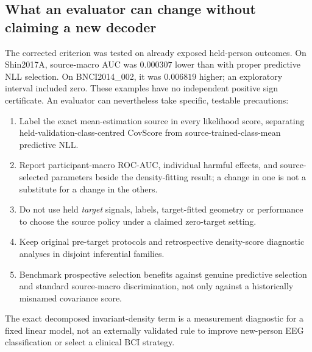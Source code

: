 \subsection{What an evaluator can change without claiming a new decoder}
\label{sec:p1-recommendations}
The corrected criterion was tested on
already exposed held-person outcomes.
On Shin2017A, source-macro AUC was $0.000307$
lower than with proper predictive NLL selection.
On BNCI2014\_002, it was $0.006819$ higher;
an exploratory interval included zero.
These examples have no independent
positive sign certificate.
An evaluator can nevertheless take
specific, testable precautions:
\begin{enumerate}
\item Label the exact mean-estimation source
in every likelihood score, separating
held-validation-class-centred CovScore from
source-trained-class-mean predictive NLL.
\item Report participant-macro ROC-AUC,
individual harmful effects, and source-selected
parameters beside the density-fitting result;
a change in one is not a substitute for
a change in the others.
\item Do not use held \emph{target}
signals, labels, target-fitted geometry
or performance to choose the source policy
under a claimed zero-target setting.
\item Keep original pre-target protocols
and retrospective density-score diagnostic
analyses in disjoint inferential families.
\item Benchmark prospective selection benefits
against genuine predictive selection and
standard source-macro discrimination, not only
against a historically misnamed covariance score.
\end{enumerate}
The exact decomposed invariant-density term is
a measurement diagnostic for a fixed linear
model, not an externally validated rule
to improve new-person EEG classification
or select a clinical BCI strategy.
